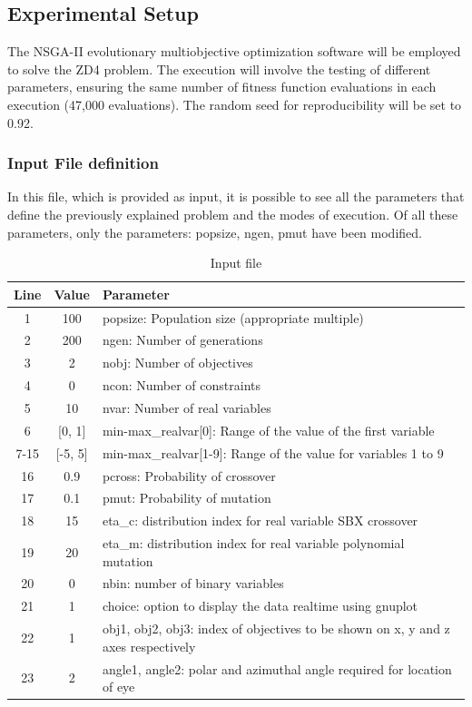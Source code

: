 \documentclass{article}
\begin{document}
\subsection{Experimental Setup}
The NSGA-II evolutionary multiobjective optimization software will be employed to solve the ZD4 problem. The execution will involve the testing of different parameters, ensuring the same number of fitness function evaluations in each execution (47,000 evaluations). The random seed for reproducibility will be set to 0.92.
\newpage
\subsubsection{Input File definition}
In this file, which is provided as input, it is possible to see all the parameters that define the previously explained problem and the modes of execution. Of all these parameters, only the parameters: popsize, ngen, pmut have been modified.
\begin{table}[h]
\centering
\begin{tabular}{|c|c|p{10cm}|}
\hline
\textbf{Line} & \textbf{Value} & \textbf{Parameter} \\
\hline
1 & 100 & popsize: Population size (appropriate multiple) \\
2 & 200 & ngen: Number of generations \\
3 & 2 & nobj: Number of objectives \\
4 & 0 & ncon: Number of constraints \\
5 & 10 & nvar: Number of real variables \\
6 & [0, 1] & min-max\_realvar[0]: Range of the value of the first variable \\
7-15 & [-5, 5] & min-max\_realvar[1-9]: Range of the value for variables 1 to 9 \\
16 & 0.9 & pcross: Probability of crossover \\
17 & 0.1 & pmut: Probability of mutation \\
18 & 15 & eta\_c: distribution index for real variable SBX crossover \\
19 & 20 & eta\_m: distribution index for real variable polynomial mutation \\
20 & 0 & nbin: number of binary variables \\
21 & 1 & choice: option to display the data realtime using gnuplot \\
22 & 1 & obj1, obj2, obj3: index of objectives to be shown on x, y and z axes respectively \\
23 & 2 & angle1, angle2: polar and azimuthal angle required for location of eye\\
\hline
\end{tabular}
\caption{Input file}
\label{table:Input_file}
\end{table}
\end{document}
